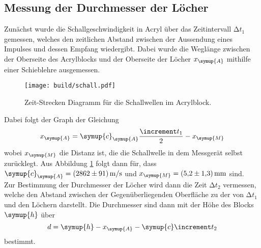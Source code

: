 \subsection{Messung der Durchmesser der Löcher}

Zunächst wurde die Schallgeschwindigkeit in Acryl über das Zeitintervall $\increment t_1$ gemessen, welches den zeitlichen
Abstand zwischen der Aussendung eines Impulses und dessen Empfang wiedergibt. Dabei wurde die Weglänge zwischen der 
Oberseite des Acrylblocks und der Oberseite der Löcher $x_{\symup{A}}$ mithilfe einer Schieblehre ausgemessen.
\begin{figure}[H]
    \texttt{[image: build/schall.pdf]}
    \centering
    \caption{Zeit-Strecken Diagramm für die Schallwellen im Acrylblock.}
    \label{fig:schall}
\end{figure}
\noindent Dabei folgt der Graph der Gleichung
\begin{equation}
    x_{\symup{A}}=\symup{c}_{\symup{A}} \frac{\increment t_1}{2}-x_{\symup{M}}
    \label{eqn:gerade}
\end{equation}
wobei $x_{\symup{M}}$ die Distanz ist, die die Schallwelle in dem Messgerät selbst zurücklegt.
Aus Abbildung \ref{fig:schall} folgt dann für, dass $\symup{c}_{\symup{A}}=\qty{2862(91)}{\meter\per\second}$ und
$x_{\symup{M}}=\qty{5.2(1.3)}{\milli\meter}$ sind.\\
Zur Bestimmung der Durchmesser der Löcher wird dann die Zeit $\increment t_2$ vermessen, welche den Abstand zwischen
der Gegenüberliegenden Oberfläche zu der von $\increment t_1$ und den Löchern darstellt.
Die Durchmesser sind dann mit der Höhe des Blocks $\symup{h}$ über
\begin{equation}
    d=\symup{h}-x_{\symup{A}}-\symup{c} \increment t_2
    \label{eqn:durchmesser}
\end{equation}
bestimmt.
